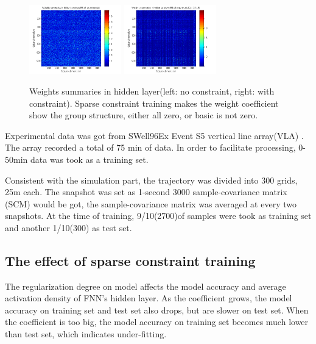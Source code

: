 \begin{figure}
\includegraphics[width=4cm,height=3cm]{figure/Weights_summaries_in_hidden_laye_swell_exp}
\includegraphics[width=4cm,height=3cm]{figure/Weights_summaries_in_hidden_layer_swell_exp_lambda_2_dot_1e_neg_5}
\caption{Weights summaries in hidden layer(left: no constraint, right: with constraint). Sparse constraint
training makes the weight coefficient show the group structure, either all zero, or basic is not zero.}
\end{figure}

Experimental data was got from SWell96Ex Event S5 vertical line array(VLA) . The array recorded a total of 75 min of data. In order to facilitate processing, 0\--50min data was took as a training set.

Consistent with the simulation part, the trajectory was divided into 300 grids, 25m each. The snapshot was set as 1-second 3000 sample-covariance matrix (SCM) would be got, the sample-covariance matrix was averaged at every two snapshots.
At the time of training, 9/10(2700)of samples were took as training set and another 1/10(300) as test set.

\subsection{The effect of sparse constraint training}
The regularization degree on model affects the model accuracy and average activation density of FNN's hidden layer. As the coefficient grows, the model accuracy on training set and test set also drops, but are slower on test set. When the coefficient is too big, the model accuracy on training set becomes much lower than test set, which indicates under-fitting.

